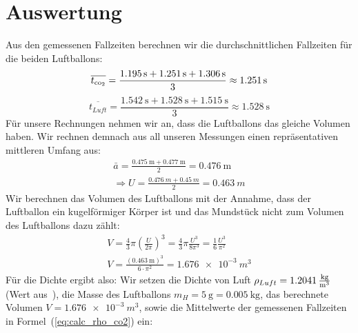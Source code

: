 \documentclass{article}
\begin{document}
    \section{Auswertung}
      Aus den gemessenen Fallzeiten berechnen wir die durchschnittlichen Fallzeiten für die beiden Luftballons: \\
      \begin{equation}\label{eq:mittel_coo}
          \overline{t_{\ce{co2}}} = \frac{ \SI{1,195}{\second} + \SI{1,251}{\second} + \SI{1,306}{\second} }{3} \approx \SI{1.251}{\second} %
      \end{equation}
      \begin{equation}
          \overline{t_{Luft}} = \frac{ \SI{1,542}{\second} + \SI{1,528}{\second} + \SI{1,515}{\second} }{3} \approx \SI{1.528}{\second} %
      \end{equation}
      Für unsere Rechnungen nehmen wir an, dass die Luftballons das gleiche Volumen haben.
      Wir rechnen demnach aus all unseren Messungen einen repräsentativen mittleren Umfang aus:
      \begin{equation}
          \begin{gathered}
              \bar{a} = \frac{ \SI{0.475}{\metre} + \SI{0.477}{\metre} }{2} = \SI{0.476}{\metre} \\
              \Rightarrow U = \frac{ \SI{0.476}{m} + \SI{0.45}{m} }{2} = \SI{0.463}{m}
          \end{gathered}
      \end{equation}
      Wir berechnen das Volumen des Luftballons mit der Annahme, dass der Luftballon ein kugelförmiger Körper ist und das Mundstück nicht zum Volumen des Luftballons dazu zählt:
      \begin{equation}\label{eq:volumen}
          \begin{gathered}
              V = \frac{4}{3} \pi {\left( \frac{U}{2 \pi} \right) }^3 = \frac{4}{3} \pi \frac{U^3}{8 \pi^3} = \frac{1}{6} \frac{U^3}{\pi^2} \\
              V = \frac{ {( \SI{0.463}{\metre} )}^3 }{ 6 \cdot \pi^2} = \SI{1.676e-3}{m^3}
          \end{gathered}
      \end{equation}
      Für die Dichte ergibt also:
      Wir setzen die Dichte von Luft \( \rho_{Luft} = \SI{1.2041}{ \frac{\kilogram}{\metre^3} } \)(Wert aus~\cite{Aufgabenstellung}), die Masse des Luftballons \(m_H = \SI{5}{\gram} = \SI{0,005}{\kilogram} \),
      das berechnete Volumen \(V = \SI{1.676e-3}{m^3} \), sowie die Mittelwerte der gemessenen Fallzeiten in Formel~(\ref{eq:calc_rho_co2}) ein:
\end{document}
